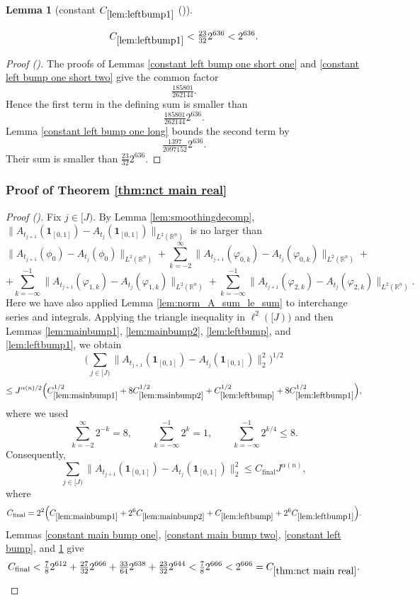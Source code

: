 \documentclass[12pt,reqno]{amsart}
\newcommand{\auto}{{({\tiny\faCar})}}
\theoremstyle{plain}
\newtheorem{lemma}[theorem]{Lemma}
\numberwithin{equation}{section}
\theoremstyle{remark}
\newcommand{\uses}[1]{}
\newcommand{\usesdefs}[1]{}
\newcommand{\leanok}{}
\newcommand{\lean}[1]{}
\newcommand{\R}{{\mathbb R}}
\begin{document}
\begin{lemma}[constant $C_{\ref{lem:leftbump1}}$ \auto]\label{constant left bump one}\uses{constant left bump one short one,constant left bump one short two,constant left bump one long,lem:leftbump1}\usesdefs{}
\lean{Auto.constantLeftBumpOne}
\leanok
\begin{equation}\label{constant left bump one bound}
C_{\ref{lem:leftbump1}}<\tfrac{23}{32}2^{636}<2^{636}.
\end{equation}
\end{lemma}
\begin{proof}[Proof \auto]
The proofs of Lemmas \ref{constant left bump one short one} and \ref{constant left bump one short two} give the common factor
\[
\tfrac{185801}{262144}.
\]
Hence the first term in the defining sum is smaller than
\[
\tfrac{185801}{262144}2^{636}.
\]
Lemma \ref{constant left bump one long} bounds the second term by
\[
\tfrac{1397}{2097152}2^{636}.
\]
Their sum is smaller than $\frac{23}{32}2^{636}$.
\end{proof}


\subsubsection{\texorpdfstring{Proof of Theorem \ref{thm:nct main real}}{Proof of main theorem}}
\begin{proof}[Proof \auto]
Fix $j\in [J)$.
By Lemma \ref{lem:smoothingdecomp},
$\|A_{t_{j + 1}}(\mathbf{1}_{[0,1]}) - A_{t_{j}}(\mathbf{1}_{[0,1]})\|_{{L}^2(\R^n)}$
is no larger than
\[ \|A_{t_{j+1}}(\phi_0) - A_{t_j}(\phi_0)\|_{L^2(\R^n)}  + \sum_{k=-2}^\infty\|A_{t_{j+1}}(\varphi_{0,k}) - A_{t_{j}}(\varphi_{0,k})\|_{L^2(\R^n)}  + \]
\[ +\sum_{k=-\infty}^{-1}\|A_{t_{j+1}}(\varphi_{1,k}) - A_{t_{j}}(\varphi_{1,k})\|_{L^2(\R^n)}  + \sum_{k=-\infty}^{-1}\|A_{t_{j+1}}({\varphi_{2,k}}) - A_{t_{j}}({\varphi_{2,k}})\|_{L^2(\R^n)}. \]
Here we have also applied Lemma \ref{lem:norm_A_sum_le_sum} to interchange series and integrals.
Applying the triangle inequality in $\ell^2([J))$ and then Lemmas \ref{lem:mainbump1}, \ref{lem:mainbump2}, \ref{lem:leftbump}, and \ref{lem:leftbump1}, we obtain
\[
\Big(\sum_{j\in[J)}\|A_{t_{j+1}}(\mathbf1_{[0,1]})-A_{t_j}(\mathbf1_{[0,1]})\|_2^2\Big)^{1/2}
\]
\[
\le J^{\alpha(n)/2}\Big(
C_{\ref{lem:mainbump1}}^{1/2}
+8C_{\ref{lem:mainbump2}}^{1/2}
+C_{\ref{lem:leftbump}}^{1/2}
+8C_{\ref{lem:leftbump1}}^{1/2}
\Big),
\]
where we used
\[
\sum_{k=-2}^\infty2^{-k}=8,
\qquad
\sum_{k=-\infty}^{-1}2^k=1,
\qquad
\sum_{k=-\infty}^{-1}2^{k/4}\le8.
\]
Consequently,
\[
\sum_{j\in[J)}\|A_{t_{j+1}}(\mathbf1_{[0,1]})-A_{t_j}(\mathbf1_{[0,1]})\|_2^2
\le C_{\mathrm{final}}J^{\alpha(n)},
\]
where
\[
C_{\mathrm{final}}
=2^2\Big(
C_{\ref{lem:mainbump1}}
+2^6C_{\ref{lem:mainbump2}}
+C_{\ref{lem:leftbump}}
+2^6C_{\ref{lem:leftbump1}}
\Big).
\]
Lemmas \ref{constant main bump one}, \ref{constant main bump two}, \ref{constant left bump}, and \ref{constant left bump one} give
\[
C_{\mathrm{final}}
<\tfrac78 2^{612}
+\tfrac{27}{32}2^{666}
+\tfrac{33}{64}2^{638}
+\tfrac{23}{32}2^{644}
<\tfrac78 2^{666}
<2^{666}
=C_{\ref{thm:nct main real}}.
\]
\end{proof}
\end{document}
